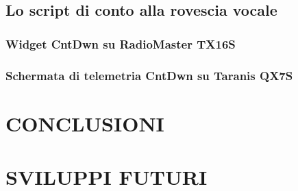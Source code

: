 \documentclass[a4paper, 12pt]{report}
\begin{document}
\section{Lo script di conto alla rovescia vocale}
\subsection{Widget CntDwn su RadioMaster TX16S}
\subsection{Schermata di telemetria CntDwn su Taranis QX7S}
\chapter{CONCLUSIONI}
\chapter{SVILUPPI FUTURI}




\end{document}
